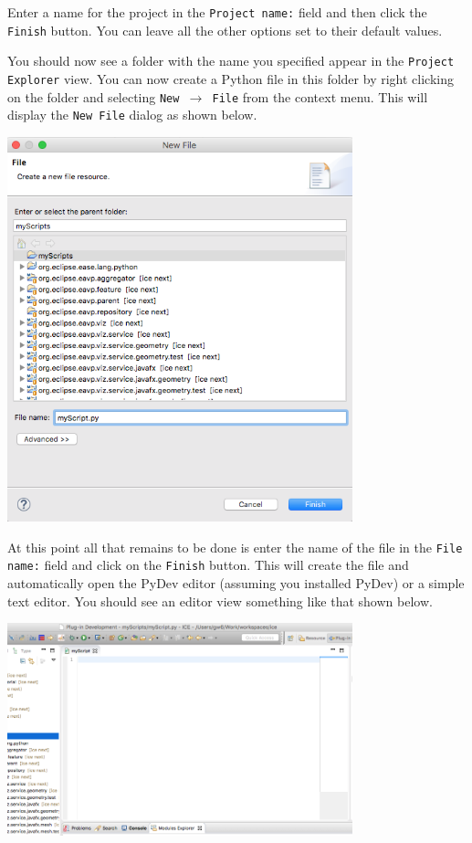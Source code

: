 \documentclass{article}
\begin{document}
Enter a name for the project in the \texttt{Project name:} field and then click the
\texttt{Finish} button. You can leave all the other options set to their default
values.

You should now see a folder with the name you specified appear in the
\texttt{Project Explorer} view. You can now create a Python file in this folder by
right clicking on the folder and selecting \texttt{New $\rightarrow$ File} from
the context menu. This will display the \texttt{New File} dialog as shown below.

\begin{center}
\includegraphics[width=10cm]{images/newfile}
\end{center}

At this point all that remains to be done is enter the name of the file in the
\texttt{File name:} field and click on the \texttt{Finish} button. This will
create the file and automatically open the PyDev editor (assuming you installed
PyDev) or a simple text editor. You should see an editor view something like
that shown below.

\begin{center}
\includegraphics[width=10cm]{images/editor}
\end{center}
\end{document}
